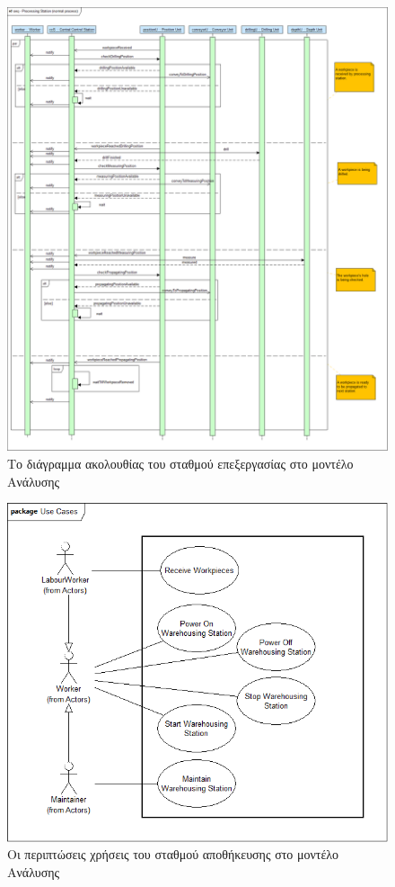 \documentclass[a4paper,12pt,twoside]{report}
\begin{document}
{\begin{appendices}
			\begin{figure}[hp]
					\centering
					\includegraphics[scale=0.30]{AnalysisModel_seq-ProcessingStation(normalprocess).png}
					\caption{Το διάγραμμα ακολουθίας του σταθμού επεξεργασίας στο μοντέλο Ανάλυσης}
					\label{φωτ:Το διάγραμμα ακολουθίας του σταθμού επεξεργασίας στο μοντέλο Ανάλυσης}
			\end{figure}
			
			\begin{figure}[hp]
					\centering
					\includegraphics[scale=0.30]{AnalysisModel_uc-WarehousingStationsUseCases.png}
					\caption{Οι περιπτώσεις χρήσεις του σταθμού αποθήκευσης στο μοντέλο Ανάλυσης}
					\label{φωτ:Οι περιπτώσεις χρήσεις του σταθμού αποθήκευσης στο μοντέλο Ανάλυσης}
			\end{figure}


\end{appendices}}
\end{document}
